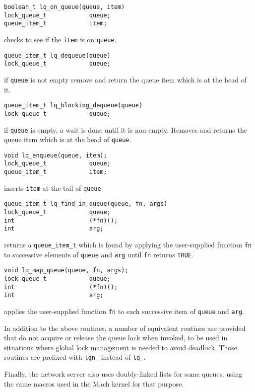 \begin{verbatim}
boolean_t lq_on_queue(queue, item)
lock_queue_t            queue;
queue_item_t            item;
\end{verbatim}
checks to see if the \verb"item" is on \verb"queue".

\begin{verbatim}
queue_item_t lq_dequeue(queue)
lock_queue_t            queue;
\end{verbatim}
if \verb"queue" is not empty remove and return the queue item which is
at the head of it.

\begin{verbatim}
queue_item_t lq_blocking_dequeue(queue)
lock_queue_t            queue;
\end{verbatim}
if \verb"queue" is empty, a wait is done until it is non-empty.  Removes and
returns the queue item which is at the head of \verb"queue".

\begin{verbatim}
void lq_enqueue(queue, item);
lock_queue_t            queue;
queue_item_t            item;
\end{verbatim}
inserts \verb"item" at the tail of \verb"queue".


\begin{verbatim}
queue_item_t lq_find_in_queue(queue, fn, args)
lock_queue_t            queue;
int                     (*fn)();
int                     arg;
\end{verbatim}
returns a \verb"queue_item_t" which is found by applying the user-supplied
function \verb"fn" to successive elements of \verb"queue" and \verb"arg"
until \verb"fn" returns \verb"TRUE".

\begin{verbatim}
void lq_map_queue(queue, fn, args);
lock_queue_t            queue;
int                     (*fn)();
int                     arg;
\end{verbatim}
applies the user-supplied function \verb"fn" to each successive item of
\verb"queue" and \verb"arg".

In addition to the above routines, a number of equivalent routines are
provided that do not acquire or release the queue lock when invoked, to
be used in situations where global lock management is needed to avoid
deadlock. Those routines are prefixed with \verb"lqn_" instead of
\verb"lq_".

Finally, the network server also uses doubly-linked lists for some
queues. using the same macros used in the Mach kernel for that purpose.

